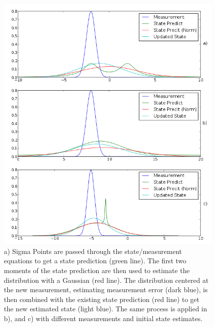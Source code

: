 \begin{figure}
\includegraphics[width=16cm]{images/kalman2}
\caption[Example Kalman Filter Progression]
{a) Sigma Points are passed through the state/measurement equations
to get a state prediction (green line). The first two moments of
the state prediction are then used to estimate the distribution with
a Gaussian (red line). The distribution centered at the new measurement,
estimating measurement error (dark blue), is then combined with the existing
state prediction (red line) to get the new estimated state (light blue).
The same process is applied in b), and c) with different measurements and
initial state estimates.}
\label{fig:EKFWorking}
\end{figure}

